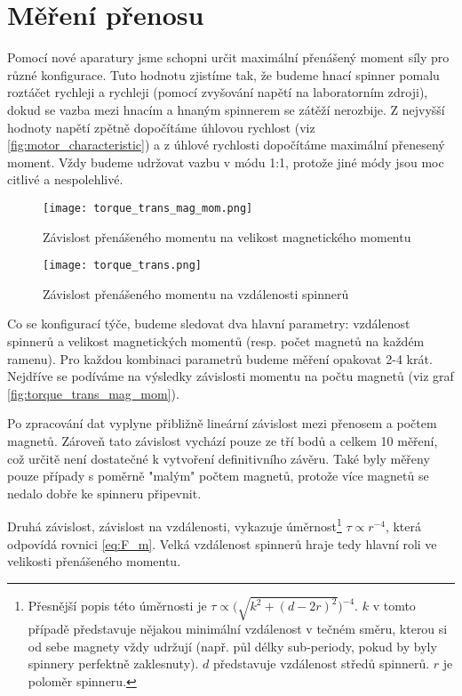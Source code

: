 \clearpage

\section{Měření přenosu}

Pomocí nové aparatury jsme schopni určit maximální přenášený moment síly pro různé konfigurace. Tuto hodnotu zjistíme tak, že budeme hnací spinner pomalu roztáčet rychleji a rychleji (pomocí zvyšování napětí na laboratorním zdroji), dokud se vazba mezi hnacím a hnaným spinnerem se zátěží nerozbije. Z nejvyšší hodnoty napětí zpětně dopočítáme úhlovou rychlost (viz \autoref{fig:motor_characteristic}) a z úhlové rychlosti dopočítáme maximální přenesený moment. Vždy budeme udržovat vazbu v módu 1:1, protože jiné módy jsou moc citlivé a nespolehlivé.

\begin{wrapfigure}{r}{0.5\textwidth}
    \vspace{-1cm}
    \texttt{[image: torque\_trans\_mag\_mom.png]}
    \centering
    \caption{Závislost přenášeného momentu na velikost magnetického momentu}
    \label{fig:torque_trans_mag_mom}

    \vspace{1cm}
    \texttt{[image: torque\_trans.png]}
    \centering
    \caption{Závislost přenášeného momentu na vzdálenosti spinnerů}
    \label{fig:torque_trans}
\end{wrapfigure}

Co se konfigurací týče, budeme sledovat dva hlavní parametry: vzdálenost spinnerů a velikost magnetických momentů (resp. počet magnetů na každém ramenu). Pro každou kombinaci parametrů budeme měření opakovat 2-4 krát. Nejdříve se podíváme na výsledky závislosti momentu na počtu magnetů (viz graf \ref{fig:torque_trans_mag_mom}).

Po zpracování dat vyplyne přibližně lineární závislost mezi přenosem a počtem magnetů. Zároveň tato závislost vychází pouze ze tří bodů a celkem 10 měření, což určitě není dostatečné k vytvoření definitivního závěru. Také byly měřeny pouze případy s poměrně "malým" počtem magnetů, protože více magnetů se nedalo dobře ke spinneru připevnit.

Druhá závislost, závislost na vzdálenosti, vykazuje úměrnost\footnote{Přesnější popis této úměrnosti je $\tau \propto \big( \sqrt{k^2+(d-2r)^2} \big)^{-4}$. $k$ v tomto případě představuje nějakou minimální vzdálenost v tečném směru, kterou si od sebe magnety vždy udržují (např. půl délky sub-periody, pokud by byly spinnery perfektně zaklesnuty). $d$ představuje vzdálenost středů spinnerů. $r$ je poloměr spinneru. } $\tau \propto r^{-4}$, která odpovídá rovnici \ref{eq:F_m}. Velká vzdálenost spinnerů hraje tedy hlavní roli ve velikosti přenášeného momentu.

\clearpage